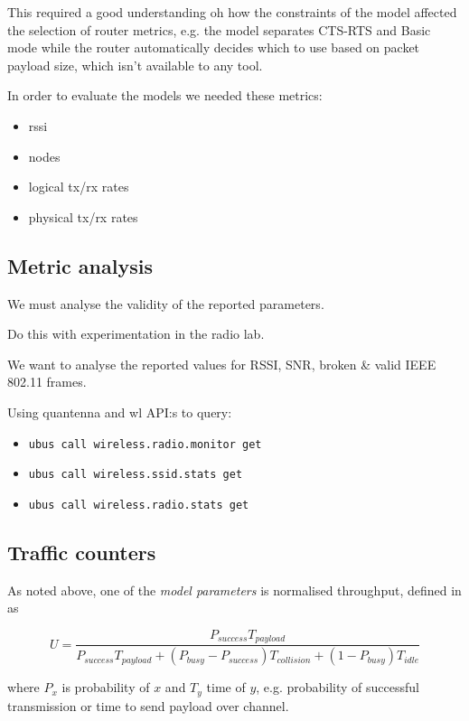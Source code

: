 This required a good understanding oh how the constraints of the model affected
the selection of router metrics, e.g. the model separates CTS-RTS and Basic mode
while the router automatically decides which to use based on packet payload
size, which isn't available to any tool.

In order to evaluate the models we needed these metrics:

\begin{itemize}
\item rssi
\item nodes
\item logical tx/rx rates
\item physical tx/rx rates
\end{itemize}

\subsection{Metric analysis}

We must analyse the validity of the reported parameters.

Do this with experimentation in the radio lab.

We want to analyse the reported values for RSSI, SNR, broken \& valid IEEE
802.11 frames.

Using quantenna and wl API:s to query:
\begin{itemize}
    \item \texttt{ubus call wireless.radio.monitor get}
    \item \texttt{ubus call wireless.ssid.stats get}
    \item \texttt{ubus call wireless.radio.stats get}
\end{itemize}

\subsection{Traffic counters}

As noted above, one of the \emph{model parameters} is normalised throughput,
defined in \cite{felemban} as

\begin{equation}
U = \frac{P_{success}T_{payload}}{P_{success}T_{payload} + (P_{busy} -
P_{success})T_{collision} + (1 - P_{busy})T_{idle}}
\end{equation}

where $P_x$ is probability of $x$ and $T_y$ time of $y$, e.g. probability of successful transmission or time to send payload over channel.

